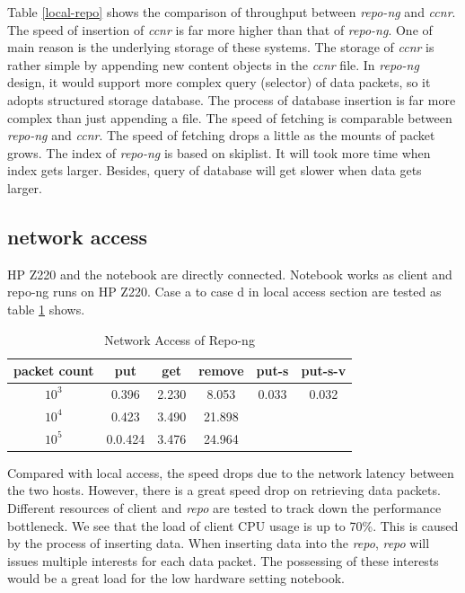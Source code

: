 \documentclass[conference]{IEEEtran}
\begin{document}
Table \ref{local-repo} shows the comparison of throughput between \emph{repo-ng} and \emph{ccnr}. The speed of insertion of \emph{ccnr} is far more higher than that of \emph{repo-ng}. One of main reason is the underlying storage of these systems. The storage of \emph{ccnr} is rather simple by appending new content objects in the \emph{ccnr} file. In \emph{repo-ng} design, it would support more complex query (selector) of data packets, so it adopts structured storage database. The process of database insertion is far more complex than just appending a file. The speed of fetching is comparable between \emph{repo-ng} and \emph{ccnr}. The speed of fetching drops a little as the mounts of packet grows. The index of \emph{repo-ng} is based on skiplist. It will took more time when index gets larger. Besides, query of database will get slower when data gets larger.

\subsection{network access}
HP Z220 and the notebook are directly connected. Notebook works as client and repo-ng runs on HP Z220. Case a to case d in local access section are tested as table \ref{network-repo} shows.

\begin{table}[htbp]
\centering
\caption{Network Access of Repo-ng}
\label{network-repo}
\begin{tabular}{ | c | c | c | c | c | c | }
    \hline
    packet count & put & get & remove & put-s & put-s-v \\ \hline
    $10^3$ & 0.396 & 2.230 & 8.053 & 0.033 & 0.032  \\ \hline
    $10^4$ & 0.423 & 3.490 & 21.898 & & \\ \hline
    $10^5$ & 0.0.424 & 3.476 & 24.964 & & \\ \hline
\end{tabular}
\end{table}

Compared with local access, the speed drops due to the network latency between the two hosts. However, there is a great speed drop on retrieving data packets. Different resources of client and \emph{repo} are tested to track down the performance bottleneck. We see that the  load of client CPU usage is up to 70\%. This is caused by the process of inserting data. When inserting data into the \emph{repo}, \emph{repo} will issues multiple interests for each data packet. The possessing of these interests would be a great load for the low hardware setting notebook.
\end{document}
